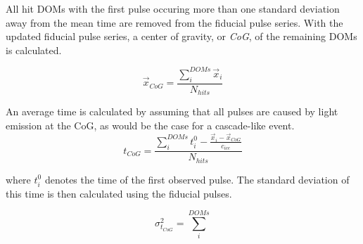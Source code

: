 All hit DOMs with the first pulse occuring more than one standard deviation away from the mean time are removed from the fiducial pulse series.
With the updated fiducial pulse series, a center of gravity, or \emph{CoG}, of the remaining DOMs is calculated.

\begin{equation}
	\vec{x}_{CoG}=\frac{\sum_i^{DOMs} \vec{x}_i}{N_{hits}}
\end{equation}

An average time is calculated by assuming that all pulses are caused by light emission at the CoG, as would be the case for a cascade-like event.
\begin{equation}
	t_{CoG} = \frac{\sum_i^{DOMs} t_i^0 - \frac{\vec{x}_i - \vec{x}_{CoG}}{c_{ice}}}{N_{hits}}
\end{equation}

where $t_i^0$ denotes the time of the first observed pulse.
The standard deviation of this time is then calculated using the fiducial pulses.

\begin{equation}
	\sigma_{t_{CoG}}^2 = \sum_{i}^{DOMs} 
\end{equation}

